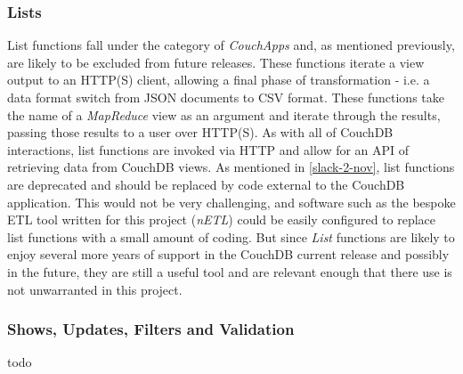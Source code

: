 \subsubsection{Lists}
List functions fall under the category of \textit{CouchApps} and, as mentioned previously, are likely to be excluded from future releases. These functions iterate a view output to an HTTP(S) client, allowing a final phase of transformation - i.e. a data format switch from JSON documents to CSV format. These  functions take the name of a \textit{MapReduce} view as an argument and iterate through the results, passing those results to a user over HTTP(S). As with all of CouchDB interactions, list functions are invoked via HTTP and allow for an API of retrieving data from CouchDB views. As mentioned in \ref{slack-2-nov}, list functions are deprecated and should be replaced by code external to the CouchDB application. This would not be very challenging, and software such as the bespoke ETL tool written for this project (\textit{nETL}) could be easily configured to replace list functions with a small amount of coding. But since \textit{List} functions are likely to enjoy several more years of support in the CouchDB current release and possibly in the future, they are still a useful tool and are relevant enough that there use is not unwarranted in this project.

\subsubsection{Shows, Updates, Filters and Validation}
todo